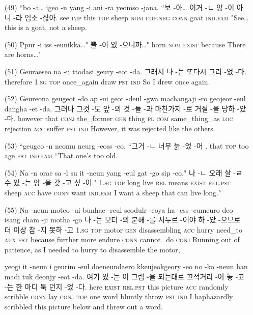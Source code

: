 \begin{itemize}
\item [(49)]
\tgl
		{``bo -a… igeo -n yang -i ani -ra yeomso -jana.}
		{``보 -아… 이거 -ㄴ 양 -이 아니 -라 염소 -잖아.}
		{see	\textsc{imp}	this	\textsc{top}	sheep	\textsc{nom}	\textsc{cop.neg}	\textsc{conn}	goat	\textsc{ind.fam}}
		{"See… this is a goat, not a sheep.}
		
\item [(50)]
\tgl
		{Ppur -i iss -eunikka…"}
		{뿔 -이 있 -으니까…"}
		{horn	\textsc{nom}	\textsc{exist}	because}
		{There are horns…"}
		
\item [(51)]
\tgl
		{Geuraeseo na -n ttodasi geury -eot -da.}
		{그래서 나 -는 또다시 그리 -었 -다.}
		{therefore	\textsc{1.sg}	\textsc{top}	once\_again	draw	\textsc{pst}	\textsc{ind}}
		{So I drew once again.}
		
\item [(52)]
\tgl
		{Geureona geugeot -do ap -ui geot -deul -gwa machangaji -ro geojeor -eul dangha -et -da.}
		{그러나 그것 -도 앞 -의 것 -들 -과 마찬가지 -로 거절 -을 당하 -았 -다.}
		{however	that	\textsc{conj}	the\_former	\textsc{gen}	thing	\textsc{pl}	\textsc{com}	same\_thing\_as	\textsc{loc}	rejection	\textsc{acc}	suffer	\textsc{pst}	\textsc{ind}}
		{However, it was rejected like the others.}

\item [(53)]
\tgl
		{``geugeo -n neomu neurg -eoss -eo.}
		{``그거 -ㄴ 너무 늙 -었 -어 .}
		{that	\textsc{top}	too	age	\textsc{pst}	\textsc{ind.fam}}
		{``That one's too old.}
		
\item [(54)]
\tgl
		{Na -n orae sa -l su it -neun yang -eul gat -go sip -eo."}
		{나 -ㄴ 오래 살 -ㄹ 수 있 -는 양 -을 갖 -고 싶 -어."}
		{\textsc{1.sg}	\textsc{top}	long	live	\textsc{rel}	means	\textsc{exist}	\textsc{rel.pst}	sheep	\textsc{acc}	have	\textsc{conn}	want	\textsc{ind.fam}}
		{I want a sheep that can live long."}

\item [(55)]
\tgl
		{Na -neun moteo -ui bunhae -reul seodulr -eoya ha -ess -eumeuro deo isang cham -ji motha -go}
		{나 -는 모터 -의 분해 -를 서두르 -어야 하 -았 -으므로 더 이상 참 -지 못하 -고}
		{\textsc{1.sg}	\textsc{top}	motor	\textsc{gen}	disassembling	\textsc{acc}	hurry	need\_to	\textsc{aux}	\textsc{pst}	because	further	more	endure	\textsc{conn}	cannot\_do	\textsc{conj}}
		{Running out of patience, as I needed to hurry to disassemble the motor,}

\tgl
		{yeogi it -neun i geurim -eul doeneundaero kkeujeokgeory -eo no -ko -neun han madi tuk deonjy -eot -da.}
		{여기 있 -는 이 그림 -을 되는대로 끄적거리 -어 놓 -고 -는 한 마디 툭 던지 -었 -다.}
		{here	\textsc{exist}	\textsc{rel.pst}	this	picture	\textsc{acc}	randomly	scribble	\textsc{conn}	lay	\textsc{conj}	\textsc{top}	one	word	bluntly	throw	\textsc{pst}	\textsc{ind}}
		{I haphazardly scribbled this picture below and threw out a word.}
		

\end{itemize}
